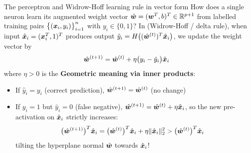 \documentclass[aspectratio=169]{beamer}\usepackage[]{graphicx}\usepackage[]{xcolor}
\begin{document}
\begin{frame}{The perceptron and Widrow-Hoff learning rule in vector form}
How does a single neuron learn its augmented weight vector $\hat{\bm{w}} = (\bm{w}^T, b)^T \in \mathbb{R}^{p+1}$ from labelled training pairs $\big\{(\bm{x}_i, y_i)\big\}_{i=1}^n$ with $y_i \in \{0, 1\}$?
\vfill
In  (Widrow-Hoff / delta rule), when input $\hat{\bm{x}}_i = (\bm{x}_i^T, 1)^T$ produces output $\hat{y}_i = H\big((\hat{\bm{w}}^{(t)})^T \hat{\bm{x}}_i\big)$, we update the weight vector by
\[
\hat{\bm{w}}^{(t+1)} = \hat{\bm{w}}^{(t)} + \eta \big(y_i - \hat{y}_i\big) \hat{\bm{x}}_i
\]
where $\eta > 0$ is the 
\vfill
\textbf{Geometric meaning via inner products}:
\begin{itemize}
\item If $\hat{y}_i = y_i$ (correct prediction), $\hat{\bm{w}}^{(t+1)} = \hat{\bm{w}}^{(t)}$ (no change)
\item If $y_i = 1$ but $\hat{y}_i = 0$ (false negative), $\hat{\bm{w}}^{(t+1)} = \hat{\bm{w}}^{(t)} + \eta \hat{\bm{x}}_i$, so the new pre-activation on $\hat{\bm{x}}_i$ strictly increases:
\[
\big(\hat{\bm{w}}^{(t+1)}\big)^T \hat{\bm{x}}_i = \big(\hat{\bm{w}}^{(t)}\big)^T \hat{\bm{x}}_i + \eta \|\hat{\bm{x}}_i\|_2^2 > \big(\hat{\bm{w}}^{(t)}\big)^T \hat{\bm{x}}_i
\]
tilting the hyperplane normal $\hat{\bm{w}}$ towards $\hat{\bm{x}}_i$!
\end{itemize}
\end{frame}
\end{document}

